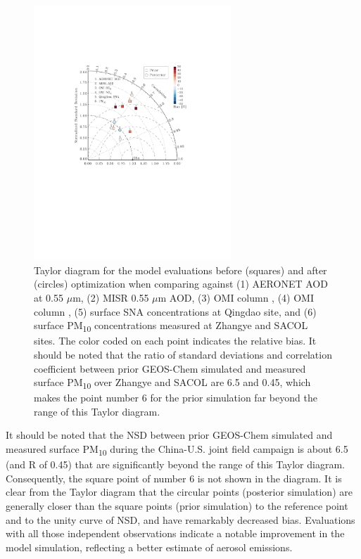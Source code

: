  \begin{figure}[t]
  \centering
  \includegraphics[width={0.66\textwidth}]{figures/a12.pdf}
  \caption{Taylor diagram for the model evaluations before (squares) and after (circles) optimization when comparing against (1) AERONET AOD at 0.55 $\mu$m, (2) MISR 0.55 $\mu$m AOD, (3) OMI column , (4) OMI column , (5) surface SNA concentrations at Qingdao site, and (6) surface PM\textsubscript{10} concentrations measured at Zhangye and SACOL sites. The color coded on each point indicates the relative bias. It should be noted that the ratio of standard deviations and correlation coefficient between prior GEOS-Chem simulated and measured surface PM\textsubscript{10} over Zhangye and SACOL are 6.5 and 0.45, which makes the point number 6 for the prior simulation far beyond the range of this Taylor diagram. }
  \label{fig:taylor}
 \end{figure}

 It should be noted that the NSD between prior GEOS-Chem simulated
 and measured surface PM\textsubscript{10} during the China-U.S. joint field campaign
 is about 6.5 (and R of 0.45) that are significantly beyond the range of this Taylor diagram.
 Consequently, the square point of number 6 is not shown in the diagram.
 It is clear from the Taylor diagram that the circular points (posterior simulation)
 are generally closer than the square points (prior simulation) to the reference point
 and to the unity curve of NSD, and have remarkably decreased bias.
 Evaluations with all those independent observations indicate a notable
 improvement in the model simulation, reflecting a better estimate of aerosol emissions.

